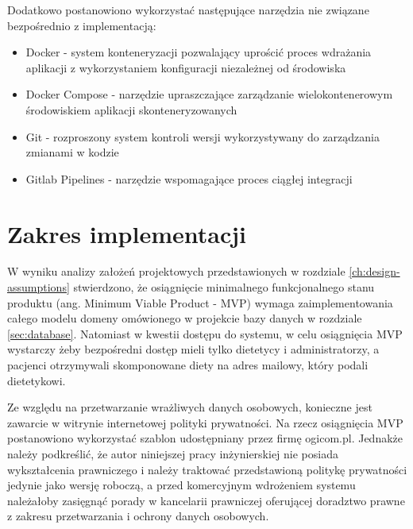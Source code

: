 \par
Dodatkowo postanowiono wykorzystać następujące narzędzia nie związane bezpośrednio z implementacją:
\begin{itemize}
    \item Docker\cite{tech:docker} - system konteneryzacji pozwalający uprościć proces wdrażania aplikacji z wykorzystaniem konfiguracji niezależnej od środowiska
    \item Docker Compose\cite{tech:docker-compose} - narzędzie upraszczające zarządzanie wielokontenerowym środowiskiem aplikacji skonteneryzowanych
    \item Git\cite{tech:git} - rozproszony system kontroli wersji wykorzystywany do zarządzania zmianami w kodzie
    \item Gitlab Pipelines\cite{tech:gitlab-pipelines} - narzędzie wspomagające proces ciągłej integracji
\end{itemize}

\section{Zakres implementacji}\label{sec:implementation-scope}

W wyniku analizy założeń projektowych przedstawionych w rozdziale \ref{ch:design-assumptions} stwierdzono,
że osiągnięcie minimalnego funkcjonalnego stanu produktu (ang. Minimum Viable Product - MVP)
wymaga zaimplementowania całego modelu domeny omówionego w projekcie bazy danych w rozdziale \ref{sec:database}.
Natomiast w kwestii dostępu do systemu, w celu osiągnięcia MVP wystarczy żeby bezpośredni dostęp mieli tylko dietetycy i administratorzy,
a pacjenci otrzymywali skomponowane diety na adres mailowy, który podali dietetykowi.

\par
Ze względu na przetwarzanie wrażliwych danych osobowych, konieczne jest zawarcie w witrynie internetowej polityki prywatności.
Na rzecz osiągnięcia MVP postanowiono wykorzystać szablon udostępniany przez firmę ogicom.pl.
Jednakże należy podkreślić, że autor niniejszej pracy inżynierskiej nie posiada wykształcenia prawniczego
i należy traktować przedstawioną politykę prywatności jedynie jako wersję roboczą,
a przed komercyjnym wdrożeniem systemu należałoby zasięgnąć porady w kancelarii prawniczej oferującej doradztwo prawne z zakresu przetwarzania i ochrony danych osobowych.


